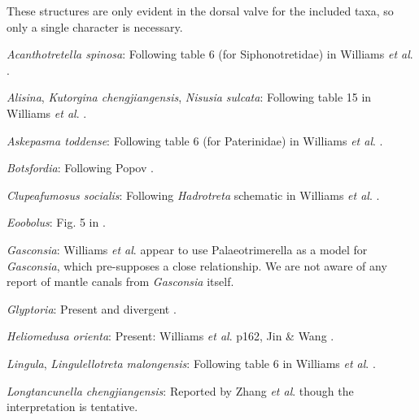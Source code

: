 \documentclass[openany]{book}
\begin{document}
These structures are only evident in the dorsal valve for the included
taxa, so only a single character is necessary.

\hypertarget{Acanthotretella_spinosa-coding-38}{}
\emph{Acanthotretella spinosa}: Following table 6 (for Siphonotretidae)
in Williams \emph{et al}.
\citeyearpar{Williams2000LinguliformeaCraniiformea}.

\hypertarget{Alisina-coding-38}{}
\emph{Alisina}, \emph{Kutorgina chengjiangensis}, \emph{Nisusia
sulcata}: Following table 15 in Williams \emph{et al}.
\citeyearpar{Williams2000LinguliformeaCraniiformea}.

\hypertarget{Askepasma_toddense-coding-38}{}
\emph{Askepasma toddense}: Following table 6 (for Paterinidae) in
Williams \emph{et al}.
\citeyearpar{Williams2000LinguliformeaCraniiformea}.

\hypertarget{Botsfordia-coding-38}{}
\emph{Botsfordia}: Following Popov \citeyearpar[fig.
2]{Popov1992TheCambrian}.

\hypertarget{Clupeafumosus_socialis-coding-38}{}
\emph{Clupeafumosus socialis}: Following \emph{Hadrotreta} schematic in
Williams \emph{et al}.
\citeyearpar{Williams2000LinguliformeaCraniiformea}.

\hypertarget{Eoobolus-coding-38}{}
\emph{Eoobolus}: Fig. 5 in \citet{Balthasar2009Thebrachiopod}.

\hypertarget{Gasconsia-coding-38}{}
\emph{Gasconsia}: Williams \emph{et al}. \citeyearpar[table
15]{Williams2000LinguliformeaCraniiformea} appear to use
Palaeotrimerella \citep[as drawn in][]{Williams1997Introduction} as a
model for \emph{Gasconsia}, which pre-supposes a close relationship. We
are not aware of any report of mantle canals from \emph{Gasconsia}
itself.

\hypertarget{Glyptoria-coding-38}{}
\emph{Glyptoria}: Present and divergent
\citep{Williams2000LinguliformeaCraniiformea}.

\hypertarget{Heliomedusa_orienta-coding-38}{}
\emph{Heliomedusa orienta}: Present: Williams \emph{et al}.
\citeyearpar{Williams2000LinguliformeaCraniiformea} p162, Jin \& Wang
\citeyearpar{Jin1992Revisionof}.

\hypertarget{Lingula-coding-38}{}
\emph{Lingula}, \emph{Lingulellotreta malongensis}: Following table 6 in
Williams \emph{et al}.
\citeyearpar{Williams2000LinguliformeaCraniiformea}.

\hypertarget{Longtancunella_chengjiangensis-coding-38}{}
\emph{Longtancunella chengjiangensis}: Reported by Zhang \emph{et al}.
\citeyearpar{Zhang2007Agregarious} though the interpretation is
tentative.
\end{document}
